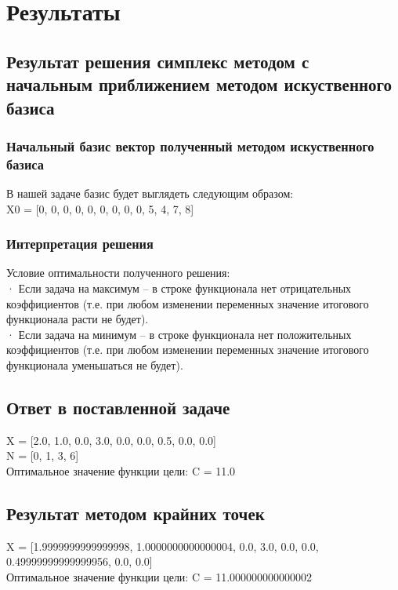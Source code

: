 \documentclass[a4]{article}
\begin{document}
	\section{Результаты}
		\subsection{Результат решения симплекс методом с начальным приближением методом искуственного базиса}
			\subsubsection{Начальный базис вектор полученный методом искуственного базиса}
				В нашей задаче базис будет выглядеть следующим образом:\\
				X0 = [0, 0, 0, 0, 0, 0, 0, 0, 0, 5, 4, 7, 8]
			\subsubsection{Интерпретация решения}
				Условие оптимальности полученного решения:\\
				· Если задача на максимум – в строке функционала нет отрицательных коэффициентов (т.е. при любом изменении переменных значение итогового функционала расти не будет).\\
				· Если задача на минимум – в строке функционала нет положительных коэффициентов (т.е. при любом изменении переменных значение итогового функционала уменьшаться не будет).
			
			\subsection{Ответ в поставленной задаче}
				X = [2.0, 1.0, 0.0, 3.0, 0.0, 0.0, 0.5, 0.0, 0.0]\\
				
				N = [0, 1, 3, 6]\\
				
				Оптимальное значение функции цели: C = 11.0
			\subsection{Результат методом крайних точек}
				X = [1.9999999999999998, 1.0000000000000004, 0.0, 3.0, 0.0, 0.0, 0.49999999999999956, 0.0, 0.0]\\
				
				Оптимальное значение функции цели: C = 11.000000000000002
\end{document}
